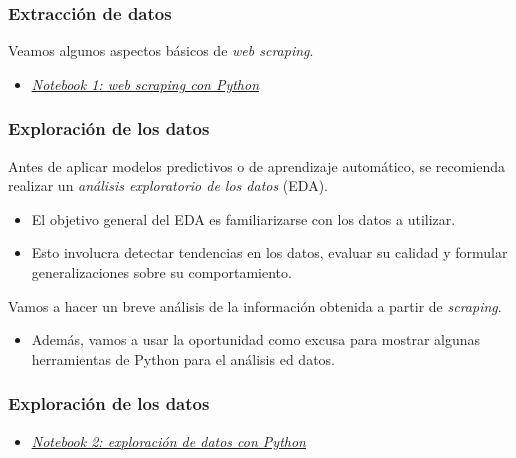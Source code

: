 \documentclass{beamer}
\newcommand{\blue}[1] {{\color{blue} #1}}
\begin{document}
\begin{frame}
\frametitle{Extracción de datos}

Veamos algunos aspectos básicos de \alert{\textit{web scraping}}.


\begin{itemize}
\item[\ding{229}] \href{https://colab.research.google.com/drive/1N2M1gnpTMQAwDwskLtsPl0keQ-OzNXdp?usp=sharing}{\blue{\textit{\uline{Notebook 1: web scraping con Python}}}}
\end{itemize}

\end{frame}

\begin{frame}
\frametitle{Exploración de los datos}

Antes de aplicar modelos predictivos o de aprendizaje automático, se recomienda realizar un \alert{\textit{análisis exploratorio de los datos}} (EDA).

\begin{itemize}
\item[\ding{52}] El objetivo general del EDA es familiarizarse con los datos a utilizar.

\item[\ding{52}] Esto involucra detectar tendencias en los datos, evaluar su calidad y formular generalizaciones sobre su comportamiento.

\end{itemize}

Vamos a hacer un breve análisis de la información obtenida a partir de \alert{\textit{scraping}}.

\begin{itemize}
\item[\ding{229}] Además, vamos a usar la oportunidad como excusa para mostrar algunas herramientas de Python para el análisis ed datos.
\end{itemize}

\end{frame}

\begin{frame}
\frametitle{Exploración de los datos}

\begin{itemize}
\item[\ding{229}] \href{https://colab.research.google.com/drive/1yxesc-NQFy2TI05ux38Xbt5SduvjETlw?usp=sharing}{\blue{\textit{\uline{Notebook 2: exploración de datos con Python}}}}
\end{itemize}

\end{frame}
\end{document}

